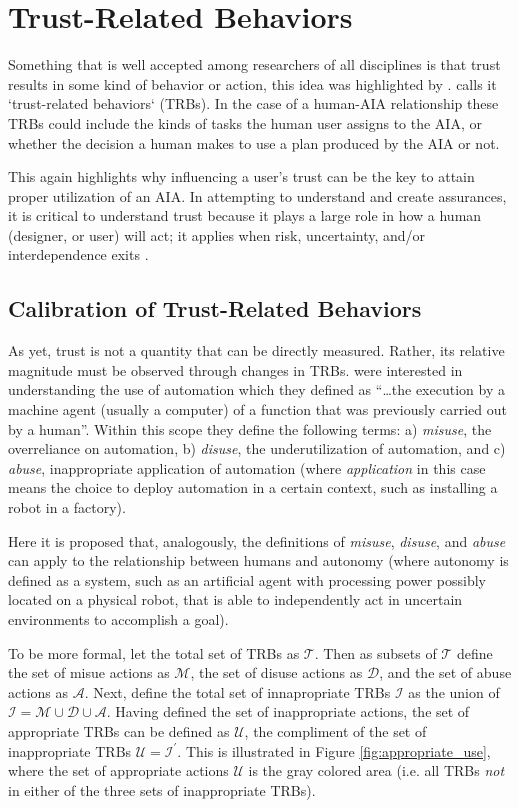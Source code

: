 \section{Trust-Related Behaviors}
Something that is well accepted among researchers of all disciplines is that trust results in some kind of behavior or action, this idea was highlighted by \citet{Lewis1985-pr}.  \citet{McKnight2001-fa} calls it `trust-related behaviors` (TRBs). In the case of a human-AIA relationship these TRBs could include the kinds of tasks the human user assigns to the AIA, or whether the decision a human makes to use a plan produced by the AIA or not. 

This again highlights why influencing a user's trust can be the key to attain proper utilization of an AIA. In attempting to understand and create assurances, it is critical to understand trust because it plays a large role in how a human (designer, or user) will act; it applies when risk, uncertainty, and/or interdependence exits \cite{McKnight2001}.

\subsection{Calibration of Trust-Related Behaviors}
    As yet, trust is not a quantity that can be directly measured. Rather, its relative magnitude must be observed through changes in TRBs. \citet{Parasuraman1997-co} were interested in understanding the use of automation which they defined as ``\ldots the execution by a machine agent (usually a computer) of a function that was previously carried out by a human''. Within this scope they define the following terms: a) \emph{misuse}, the overreliance on automation, b) \emph{disuse}, the underutilization of automation, and c) \emph{abuse}, inappropriate application of automation (where \emph{application} in this case means the choice to deploy automation in a certain context, such as installing a robot in a factory).

    Here it is proposed that, analogously, the definitions of \emph{misuse}, \emph{disuse}, and \emph{abuse} can apply to the relationship between humans and autonomy (where autonomy is defined as a system, such as an artificial agent with processing power possibly located on a physical robot, that is able to independently act in uncertain environments to accomplish a goal).
    
    To be more formal, let the total set of TRBs as $\mathcal{T}$. Then as subsets of $\mathcal{T}$ define the set of misue actions as $\mathcal{M}$, the set of disuse actions as $\mathcal{D}$, and the set of abuse actions as $\mathcal{A}$. Next, define the total set of innapropriate TRBs $\mathcal{I}$ as the union of $\mathcal{I} = \mathcal{M}\cup \mathcal{D}\cup\mathcal{A}$. Having defined the set of inappropriate actions, the set of appropriate TRBs can be defined as $\mathcal{U}$, the compliment of the set of inappropriate TRBs $\mathcal{U} = \mathcal{I}^\prime$. This is illustrated in Figure \ref{fig:appropriate_use}, where the set of appropriate actions $\mathcal{U}$ is the gray colored area (i.e. all TRBs \emph{not} in either of the three sets of inappropriate TRBs).
    
